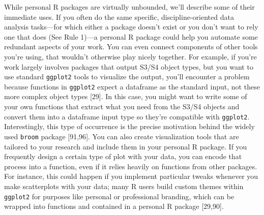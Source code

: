 \documentclass[10pt,letterpaper]{article}
\begin{document}
While personal R packages are virtually unbounded, we'll describe some
of their immediate uses. If you often do the same specific,
discipline-oriented data analysis tasks---for which either a package
doesn't exist or you don't want to rely one that does (See Rule 1)---a
personal R package could help you automate some redundant aspects of
your work. You can even connect components of other tools you're using,
that wouldn't otherwise play nicely together. For example, if you're
work largely involves packages that output S3/S4 object types, but you
want to use standard \texttt{ggplot2} tools to visualize the output,
you'll encounter a problem because functions in \texttt{ggplot2} expect
a dataframe as the standard input, not these more complex object types
{[}29{]}. In this case, you might want to write some of your own
functions that extract what you need from the S3/S4 objects and convert
them into a dataframe input type so they're compatible with
\texttt{ggplot2}. Interestingly, this type of occurrence is the precise
motivation behind the widely used \texttt{broom} package {[}91,96{]}.
You can also create visualization tools that are tailored to your
research and include them in your personal R package. If you frequently
design a certain type of plot with your data, you can encode that
process into a function, even if it relies heavily on functions from
other packages. For instance, this could happen if you implement
particular tweaks whenever you make scatterplots with your data; many R
users build custom themes within \texttt{ggplot2} for purposes like
personal or professional branding, which can be wrapped into functions
and contained in a personal R package {[}29,90{]}.
\end{document}
